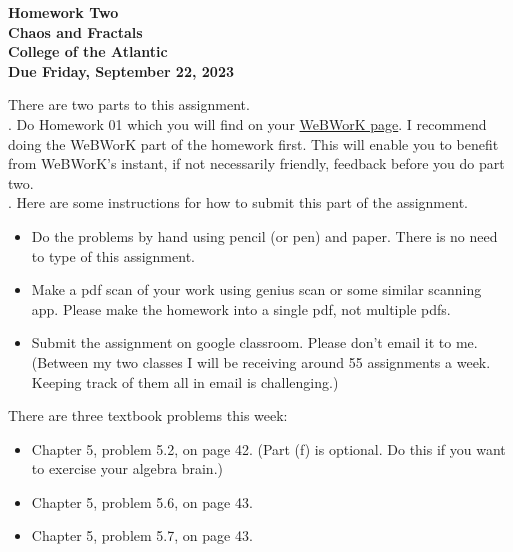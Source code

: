 \documentclass[12pt]{article}
\begin{document}
\pagestyle{empty}
 
\begin{center}
{\LARGE {\bf Homework Two}}\\
\bigskip
{\Large {\bf Chaos and Fractals}}\\
\bigskip
{\Large {\bf College of the Atlantic}}\\
\bigskip
{ {\bf Due Friday, September 22, 2023}}\\  
\end{center}
\medskip


\noindent There are two parts to this assignment.\\

.  Do Homework 01 which you will find
on your
\href{https://webwork-hosting.runestone.academy/webwork2/coa-feldman-es1026i-fall2023}{WeBWorK
  page}.  I recommend doing the WeBWorK part of the 
homework first.  This will enable you to benefit from WeBWorK's
instant, if not necessarily friendly, feedback before you do part two.\\

.  Here are some
instructions for how to submit this part of the assignment.
\begin{itemize}
\item Do the problems by hand using pencil (or pen) and paper.
  There is no need to type of this assignment.
\item Make a pdf scan of your work using genius scan or some
  similar scanning app.  Please make the homework into a single
  pdf, not multiple pdfs.
\item Submit the assignment on google classroom.  Please don't
  email it to me.  (Between my two classes I will be receiving
  around 55 assignments a week.  Keeping track of them all in email
  is challenging.)
\end{itemize}

\noindent There are three textbook problems this week:

\begin{itemize}
\setlength{\itemsep}{-1mm}
\item Chapter 5, problem 5.2, on page 42. (Part (f) is optional. Do
  this if you want to exercise your algebra brain.)
\item Chapter 5, problem 5.6, on page 43.
\item Chapter 5, problem 5.7, on page 43. 
\end{itemize}
\end{document}
